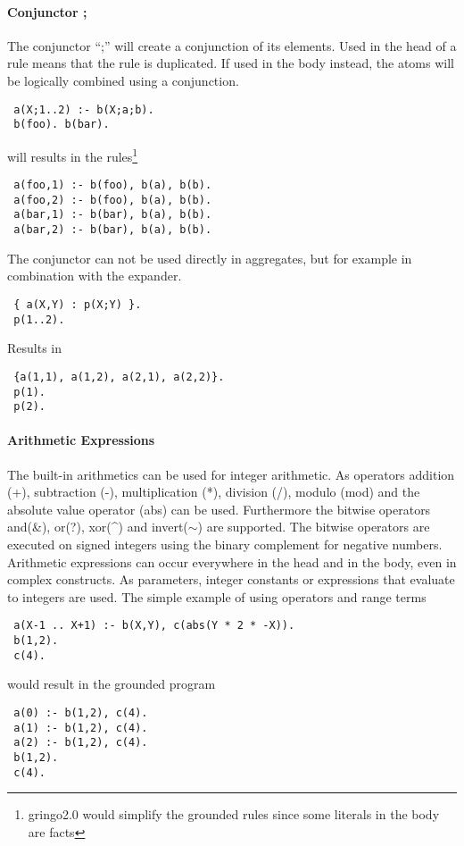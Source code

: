 \documentclass[a4paper,10pt]{article}
\begin{document}
\paragraph{Conjunctor ;}
The conjunctor ``;'' will create a conjunction of its elements.
Used in the head of a rule means that the rule is duplicated.
If used in the body instead, the atoms will be logically combined using a conjunction.
\begin{verbatim}
 a(X;1..2) :- b(X;a;b).
 b(foo). b(bar).
\end{verbatim}
will results in the rules\footnote{gringo2.0 would simplify the grounded rules since some literals in the body are facts}
\begin{verbatim}
 a(foo,1) :- b(foo), b(a), b(b).
 a(foo,2) :- b(foo), b(a), b(b).
 a(bar,1) :- b(bar), b(a), b(b).
 a(bar,2) :- b(bar), b(a), b(b).
\end{verbatim}
The conjunctor can not be used directly in aggregates, but for example in combination with the expander.
\begin{verbatim}
 { a(X,Y) : p(X;Y) }.
 p(1..2).
\end{verbatim}
Results in
\begin{verbatim}
 {a(1,1), a(1,2), a(2,1), a(2,2)}.
 p(1).
 p(2).
\end{verbatim}

\paragraph{Arithmetic Expressions}
The built-in arithmetics can be used for integer arithmetic.
As operators addition (+), subtraction (-), multiplication (*), division (/), modulo (mod) and the absolute value operator (abs) can be used.
Furthermore the bitwise operators and(\&), or(?), xor(\textasciicircum) and invert($\sim$) are supported. The bitwise operators are executed on signed integers using the binary complement for negative numbers.
Arithmetic expressions can occur everywhere in the head and in the body, even in complex constructs.
As parameters, integer constants or expressions that evaluate to integers are used.
The simple example of using operators and range terms
\begin{verbatim}
 a(X-1 .. X+1) :- b(X,Y), c(abs(Y * 2 * -X)).
 b(1,2).
 c(4).
\end{verbatim}
would result in the grounded program
\begin{verbatim}
 a(0) :- b(1,2), c(4).
 a(1) :- b(1,2), c(4).
 a(2) :- b(1,2), c(4).
 b(1,2).
 c(4).
\end{verbatim}
\end{document}
